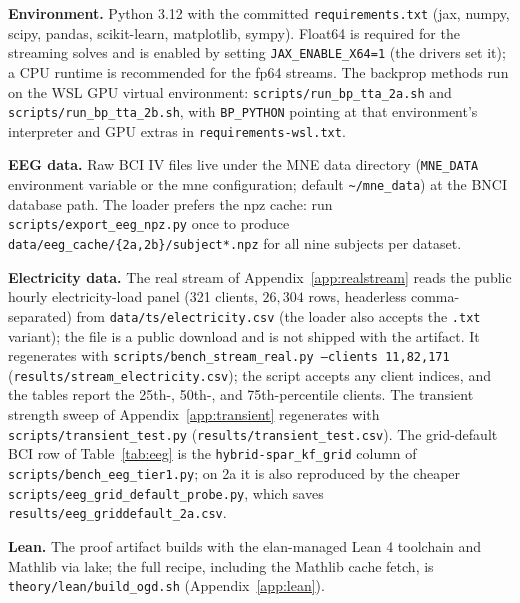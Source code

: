 \textbf{Environment.}
Python 3.12 with the committed \texttt{requirements.txt} (jax, numpy, scipy, pandas, scikit-learn, matplotlib, sympy).
Float64 is required for the streaming solves and is enabled by setting \texttt{JAX\_ENABLE\_X64=1} (the drivers set it); a CPU runtime is recommended for the fp64 streams.
The backprop methods run on the WSL GPU virtual environment: \texttt{scripts/run\_bp\_tta\_2a.sh} and \texttt{scripts/run\_bp\_tta\_2b.sh}, with \texttt{BP\_PYTHON} pointing at that environment's interpreter and GPU extras in \texttt{requirements-wsl.txt}.

\textbf{EEG data.}
Raw BCI IV files live under the MNE data directory (\texttt{MNE\_DATA} environment variable or the mne configuration; default \texttt{\~{}/mne\_data}) at the BNCI database path.
The loader prefers the npz cache: run \texttt{scripts/export\_eeg\_npz.py} once to produce \texttt{data/eeg\_cache/\{2a,2b\}/subject*.npz} for all nine subjects per dataset.

\textbf{Electricity data.}
The real stream of Appendix~\ref{app:realstream} reads the public hourly electricity-load panel (321 clients, $26{,}304$ rows, headerless comma-separated) from \texttt{data/ts/electricity.csv} (the loader also accepts the \texttt{.txt} variant); the file is a public download and is not shipped with the artifact.
It regenerates with \texttt{scripts/bench\_stream\_real.py --clients 11,82,171} (\texttt{results/stream\_electricity.csv}); the script accepts any client indices, and the tables report the 25th-, 50th-, and 75th-percentile clients.
The transient strength sweep of Appendix~\ref{app:transient} regenerates with \texttt{scripts/transient\_test.py} (\texttt{results/transient\_test.csv}).
The grid-default BCI row of Table~\ref{tab:eeg} is the \texttt{hybrid-spar\_kf\_grid} column of \texttt{scripts/bench\_eeg\_tier1.py}; on 2a it is also reproduced by the cheaper \texttt{scripts/eeg\_grid\_default\_probe.py}, which saves \texttt{results/eeg\_griddefault\_2a.csv}.

\textbf{Lean.}
The proof artifact builds with the elan-managed Lean 4 toolchain and Mathlib via lake; the full recipe, including the Mathlib cache fetch, is \texttt{theory/lean/build\_ogd.sh} (Appendix~\ref{app:lean}).

